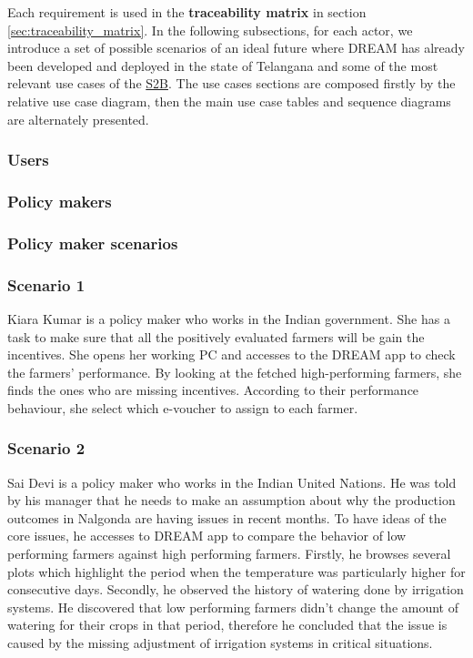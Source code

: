 Each requirement is used in the \textbf{traceability matrix} in section \ref{sec:traceability_matrix}.
In the following subsections, for each actor, we introduce a set of possible scenarios of an ideal future where DREAM has already been developed and deployed in the state of Telangana and some of the most relevant use cases of the \hyperref[tab:acronymsTable]{S2B}. The use cases sections are composed firstly by the relative use case diagram, then the main use case tables and sequence diagrams are alternately presented.

\subsubsection{Users}
\label{sect:users_requirements}




\subsubsection{Policy makers}
\subsubsection*{Policy maker scenarios}
\subsubsection*{Scenario 1}
Kiara Kumar is a policy maker who works in the Indian government. She has a task to make sure that all the positively evaluated farmers will be gain the incentives. She opens her working PC and accesses to the DREAM app to check the farmers' performance. By looking at the fetched high-performing farmers, she finds the ones who are missing incentives. According to their performance behaviour, she select which e-voucher to assign to each farmer.
\subsubsection*{Scenario 2}
Sai Devi is a policy maker who works in the Indian United Nations. He was told by his manager that he needs to make an assumption about why the production outcomes in Nalgonda are having issues in recent months. To have ideas of the core issues, he accesses to DREAM app to compare the behavior of low performing farmers against high performing farmers. Firstly, he browses several plots which highlight the period when the temperature was particularly higher for consecutive days. Secondly, he observed the history of watering done by irrigation systems. He discovered that low performing farmers didn't change the amount of watering for their crops in that period, therefore he concluded that the issue is caused by the missing adjustment of irrigation systems in critical situations.   
